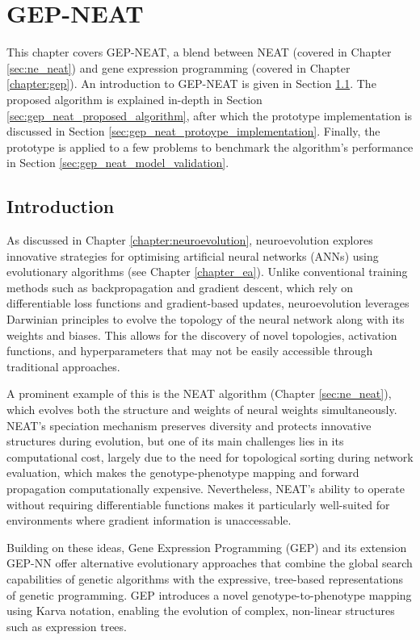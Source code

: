 \chapter{GEP-NEAT}\label{chapter:gep_neat}
This chapter covers GEP-NEAT, a blend between NEAT (covered in Chapter \ref{sec:ne_neat}) and gene expression programming (covered in Chapter \ref{chapter:gep}). An introduction to GEP-NEAT is given in Section \ref{sec:gep_neat_introduction}. The proposed algorithm is explained in-depth in Section \ref{sec:gep_neat_proposed_algorithm}, after which the prototype implementation is discussed in Section \ref{sec:gep_neat_protoype_implementation}. Finally, the prototype is applied to a few problems to benchmark the algorithm's performance in Section \ref{sec:gep_neat_model_validation}.

\section{Introduction}\label{sec:gep_neat_introduction}
As discussed in Chapter \ref{chapter:neuroevolution}, neuroevolution explores innovative strategies for optimising artificial neural networks (ANNs) using evolutionary algorithms (see Chapter \ref{chapter_ea}). Unlike conventional training methods such as backpropagation and gradient descent, which rely on differentiable loss functions and gradient-based updates, neuroevolution leverages Darwinian principles to evolve the topology of the neural network along with its weights and biases. This allows for the discovery of novel topologies, activation functions, and hyperparameters that may not be easily accessible through traditional approaches.

\parbreak\noindent A prominent example of this is the NEAT algorithm (Chapter \ref{sec:ne_neat}), which evolves both the structure and weights of neural weights simultaneously. NEAT's speciation mechanism preserves diversity and protects innovative structures during evolution, but one of its main challenges lies in its computational cost, largely due to the need for topological sorting during network evaluation, which makes the genotype-phenotype mapping and forward propagation computationally expensive. Nevertheless, NEAT's ability to operate without requiring differentiable functions makes it particularly well-suited for environments where gradient information is unaccessable.

\parbreak\noindent Building on these ideas, Gene Expression Programming (GEP) and its extension GEP-NN offer alternative evolutionary approaches that combine the global search capabilities of genetic algorithms with the expressive, tree-based representations of genetic programming. GEP introduces a novel genotype-to-phenotype mapping using Karva notation, enabling the evolution of complex, non-linear structures such as expression trees.

